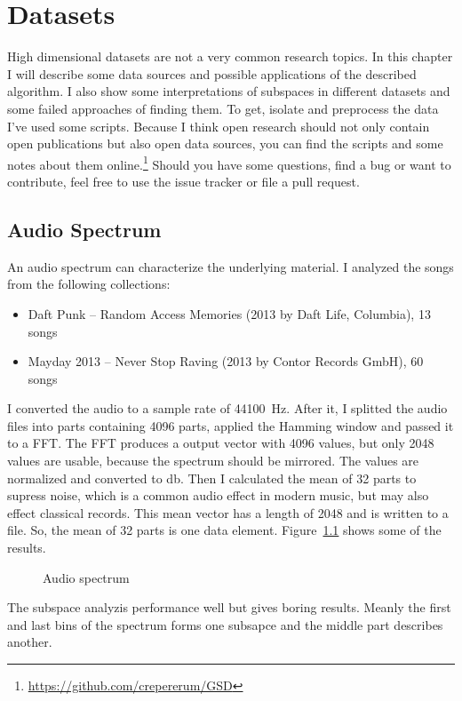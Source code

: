 \documentclass[%
	fontsize=11pt,%
	paper=a4,%
	pagesize,%
	twoside=false,%
	listof=totoc,%
	draft%
]{scrbook}
\newcommand*\circled[1]{\tikz[baseline={($(char.south) + (0,0.5pt)$)}]{
	\node[shape=circle,draw,inner sep=0.5pt,font=\tiny,thick] (char) {\textsf{#1}};}}
\begin{document}
\chapter{Datasets}
High dimensional datasets are not a very common research topics. In this chapter I will describe some data sources and possible applications of the described algorithm. I also show some interpretations of subspaces in different datasets and some failed approaches of finding them. To get, isolate and preprocess the data I've used some scripts. Because I think open research should not only contain open publications but also open data sources, you can find the scripts and some notes about them online.\footnote{\url{https://github.com/crepererum/GSD}} Should you have some questions, find a bug or want to contribute, feel free to use the issue tracker or file a pull request.

\section{Audio Spectrum}
An audio spectrum can characterize the underlying material. I analyzed the songs from the following collections:
\begin{itemize}
	\item Daft Punk -- Random Access Memories (\circled{P}2013 by Daft Life, Columbia), \num{13} songs
	\item Mayday 2013 -- Never Stop Raving (\circled{C}2013 by Contor Records GmbH), \num{60} songs
\end{itemize}
I converted the audio to a sample rate of \SI{44100}{\hertz}. After it, I splitted the audio files into parts containing \num{4096} parts, applied the Hamming window and passed it to a FFT. The FFT produces a output vector with \num{4096} values, but only \num{2048} values are usable, because the spectrum should be mirrored. The values are normalized and converted to \si{\decibel}. Then I calculated the mean of \num{32} parts to supress noise, which is a common audio effect in modern music, but may also effect classical records. This mean vector has a length of \num{2048} and is written to a file. So, the mean of \num{32} parts is one data element. Figure~\ref{fig:audio} shows some of the results.
\begin{figure}
	
	\caption{Audio spectrum}
	\label{fig:audio}
\end{figure}

The subspace analyzis performance well but gives boring results. Meanly the first and last bins of the spectrum forms one subsapce and the middle part describes another.
\end{document}

